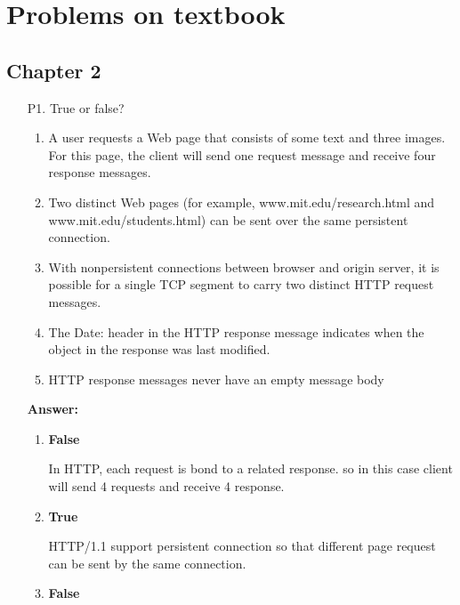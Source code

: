 \section{Problems on textbook}
\subsection{Chapter 2}

\begin{enumerate}
    
    \item [P1.] True or false?

    \begin{enumerate}
        \item A user requests a Web page that consists of some text and three images. For this page, the client will send one request message and receive four response messages.

        \item Two distinct Web pages (for example, www.mit.edu/research.html and www.mit.edu/students.html) can be sent over the same persistent connection.

        \item With nonpersistent connections between browser and origin server, it is possible for a single TCP segment to carry two distinct HTTP request messages.

        \item The Date: header in the HTTP response message indicates when the object in the response was last modified.

        \item HTTP response messages never have an empty message body
    \end{enumerate}
    
    \textbf{Answer:}
    
    \begin{enumerate}
        \item \textbf{False}
        
        In HTTP, each request is bond to a related response. so in this case client will send 4 requests and receive 4 response.
        
        \item \textbf{True}
        
        HTTP/1.1 support persistent connection so that different page request can be sent by the same connection.
        
        \item \textbf{False}
        

\end{enumerate}
\end{enumerate}
